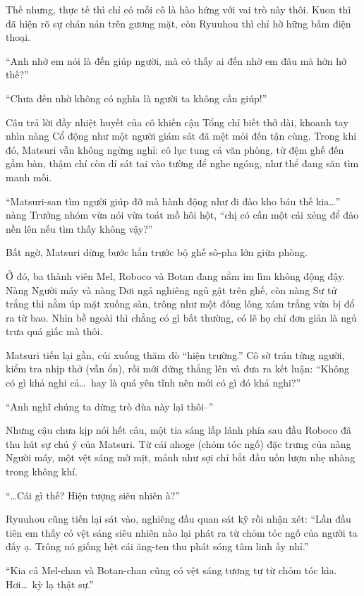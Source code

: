 \documentclass[../main.tex]{subfiles}
\begin{document}
Thế nhưng, thực tế thì chỉ có mỗi cô là hào hứng với vai trò này thôi. Kuon thì đã hiện rõ sự chán nản trên gương mặt, còn Ryuuhou thì chỉ hờ hững bấm điện thoại.

``Anh nhớ em nói là đến giúp người, mà có thấy ai đến nhờ em đâu mà hớn hở thế?''

``Chưa đến nhờ không có nghĩa là người ta không cần giúp!''

Câu trả lời đầy nhiệt huyết của cô khiến cậu Tổng chỉ biết thở dài, khoanh tay nhìn nàng Cổ động như một người giám sát đã mệt mỏi đến tận cùng. Trong khi đó, Matsuri vẫn không ngừng nghỉ: cô lục tung cả văn phòng, từ đệm ghế đến gầm bàn, thậm chí còn dí sát tai vào tường để nghe ngóng, như thể đang săn tìm manh mối.

``Matsuri-san tìm người giúp đỡ mà hành động như đi đào kho báu thế kia\dots'' nàng Trưởng nhóm vừa nói vừa toát mồ hôi hột, ``chị có cần một cái xẻng để đào nền lên nếu tìm thấy không vậy?''

Bất ngờ, Matsuri dừng bước hẳn trước bộ ghế sô-pha lớn giữa phòng.

Ở đó, ba thành viên Mel, Roboco và Botan đang nằm im lìm không động đậy. Nàng Người máy và nàng Dơi ngả nghiêng ngủ gật trên ghế, còn nàng Sư tử trắng thì nằm úp mặt xuống sàn, trông như một đống lông xám trắng vừa bị đổ ra từ bao. Nhìn bề ngoài thì chẳng có gì bất thường, có lẽ họ chỉ đơn giản là ngủ trưa quá giấc mà thôi.


Matsuri tiến lại gần, cúi xuống thăm dò ``hiện trường.'' Cô sờ trán từng người, kiểm tra nhịp thở (vẫn ổn), rồi mới đứng thẳng lên và đưa ra kết luận: ``Không có gì khả nghi cả\dots\ hay là quá yên tĩnh nên mới có gì đó khả nghi?''

``Anh nghĩ chúng ta dừng trò đùa này lại thôi--''

Nhưng cậu chưa kịp nói hết câu, một tia sáng lấp lánh phía sau đầu Roboco đã thu hút sự chú ý của Matsuri. Từ cái ahoge (chỏm tóc ngố) đặc trưng của nàng Người máy, một vệt sáng mờ mịt, mảnh như sợi chỉ bắt đầu uốn lượn nhẹ nhàng trong không khí.

``\dots Cái gì thế? Hiện tượng siêu nhiên à?''

Ryuuhou cũng tiến lại sát vào, nghiêng đầu quan sát kỹ rồi nhận xét: ``Lần đầu tiên em thấy có vệt sáng siêu nhiên nào lại phát ra từ chỏm tóc ngố của người ta đấy ạ. Trông nó giống hệt cái ăng-ten thu phát sóng tâm linh ấy nhỉ.''

``Kia cả Mel-chan và Botan-chan cũng có vệt sáng tương tự từ chỏm tóc kìa. Hơi\dots\ kỳ lạ thật sự.''
\end{document}
